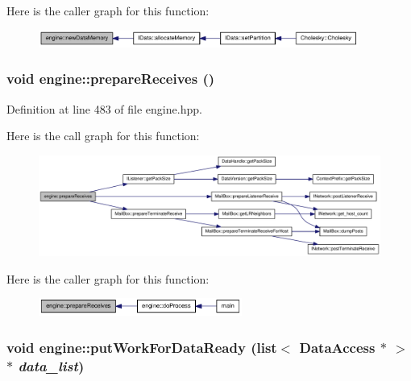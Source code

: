 Here is the caller graph for this function:\nopagebreak
\begin{figure}[H]
\begin{center}
\leavevmode
\includegraphics[width=298pt]{classengine_a99ae6156ee65044d03d61a3776ef2f99_icgraph}
\end{center}
\end{figure}
\hypertarget{classengine_af66d8ac03cdba8d98a79eb424622c25d}{
\subsubsection[{prepareReceives}]{\setlength{\rightskip}{0pt plus 5cm}void engine::prepareReceives ()}}
\label{classengine_af66d8ac03cdba8d98a79eb424622c25d}


Definition at line 483 of file engine.hpp.

Here is the call graph for this function:\nopagebreak
\begin{figure}[H]
\begin{center}
\leavevmode
\includegraphics[width=408pt]{classengine_af66d8ac03cdba8d98a79eb424622c25d_cgraph}
\end{center}
\end{figure}


Here is the caller graph for this function:\nopagebreak
\begin{figure}[H]
\begin{center}
\leavevmode
\includegraphics[width=189pt]{classengine_af66d8ac03cdba8d98a79eb424622c25d_icgraph}
\end{center}
\end{figure}
\hypertarget{classengine_a18d1d14ee93df029db2216460a8ac6f4}{
\subsubsection[{putWorkForDataReady}]{\setlength{\rightskip}{0pt plus 5cm}void engine::putWorkForDataReady (list$<$ {\bf DataAccess} $\ast$ $>$ $\ast$ {\em data\_\-list})}}
\label{classengine_a18d1d14ee93df029db2216460a8ac6f4}


